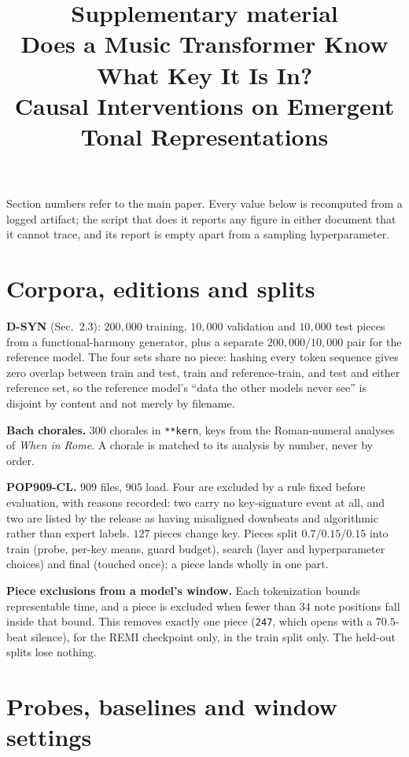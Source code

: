 \documentclass{article}
\title{Supplementary material\\
Does a Music Transformer Know What Key It Is In?\\
Causal Interventions on Emergent Tonal Representations}
\begin{document}
\maketitle
\vspace{-2.5em}

Section numbers refer to the main paper. Every value below is recomputed from a logged
artifact; the script that does it reports any figure in either document that it cannot
trace, and its report is empty apart from a sampling hyperparameter.

\section{Corpora, editions and splits}

\textbf{D-SYN} (Sec.~2.3): $200{,}000$ training, $10{,}000$ validation and $10{,}000$
test pieces from a functional-harmony generator, plus a separate $200{,}000/10{,}000$
pair for the reference model. The four sets share no piece: hashing every token
sequence gives zero overlap between train and test, train and reference-train, and
test and either reference set, so the reference model's ``data the other models never
see'' is disjoint by content and not merely by filename.

\textbf{Bach chorales.} $300$ chorales in \texttt{**kern}, keys from the
Roman-numeral analyses of \emph{When in Rome}. A chorale is matched to its analysis by
number, never by order.

\textbf{POP909-CL.} $909$ files, $905$ load. Four are excluded by a rule fixed before
evaluation, with reasons recorded: two carry no key-signature event at all, and two are
listed by the release as having misaligned downbeats and algorithmic rather than expert
labels. $127$ pieces change key. Pieces split $0.7/0.15/0.15$ into train (probe,
per-key means, guard budget), search (layer and hyperparameter choices) and final
(touched once); a piece lands wholly in one part.

\textbf{Piece exclusions from a model's window.} Each tokenization bounds
representable time, and a piece is excluded when fewer than $34$ note positions fall
inside that bound. This removes exactly one piece (\texttt{247}, which opens with a
$70.5$-beat silence), for the REMI checkpoint only, in the train split only. The
held-out splits lose nothing.

\section{Probes, baselines and window settings}
\end{document}
